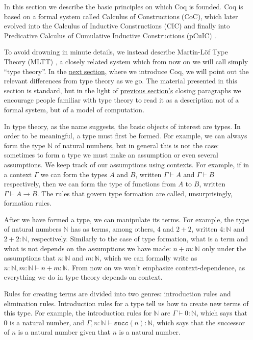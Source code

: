 \documentclass[declaration,mgr,english,shortabstract]{iithesis}
\newcommand{\m}[1]{\texttt{#1}}
\newcommand{\type}[2]{#1 \vdash #2}
\newcommand{\term}[3]{#1 \vdash #2 : #3}
\newcommand{\N}{\mathbb{N}}
\newcommand{\suc}[1]{\m{succ}(#1)}
\begin{document}
In this section we describe the basic principles on which Coq is founded. Coq is based on a formal system called Calculus of Constructions (CoC)\cite{CoC}, which later evolved into the Calculus of Inductive Constructions (CIC) \cite{CIC} and finally into Predicative Calculus of Cumulative Inductive Constructions (pCuIC) \cite{pCuIC}.

To avoid drowning in minute details, we instead describe Martin-L\"{o}f Type Theory (MLTT) \cite{MLTT1} \cite{MLTT2}, a closely related system which from now on we will call simply ``type theory''. In the \hyperref[coq]{next section}, where we introduce Coq, we will point out the relevant differences from type theory as we go. The material presented in this section is standard, but in the light of \hyperref[formal]{previous section's} closing paragraphs we encourage people familiar with type theory to read it as a description not of a formal system, but of a model of computation.

In type theory, as the name suggests, the basic objects of interest are types. In order to be meaningful, a type must first be formed. For example, we can always form the type $\N$ of natural numbers, but in general this is not the case: sometimes to form a type we must make an assumption or even several assumptions. We keep track of our assumptions using contexts. For example, if in a context $\Gamma$ we can form the types $A$ and $B$, written $\type{\Gamma}{A}$ and $\type{\Gamma}{B}$ respectively, then we can form the type of functions from $A$ to $B$, written $\type{\Gamma}{A \to B}$. The rules that govern type formation are called, unsurprisingly, formation rules.

After we have formed a type, we can manipulate its terms. For example, the type of natural numbers $\N$ has as terms, among others, $4$ and $2 + 2$, written $4 : \N$ and $2 + 2 : \N$, respectively. Similarly to the case of type formation, what is a term and what is not depends on the assumptions we have made: $n + m : \N$ only under the assumptions that $n : \N$ and $m : \N$, which we can formally write as $\term{n : \N, m : \N}{n + m}{\N}$. From now on we won't emphasize context-dependence, as everything we do in type theory depends on context.

Rules for creating terms are divided into two genres: introduction rules and elimination rules. Introduction rules for a type tell us how to create new terms of this type. For example, the introduction rules for $\N$ are $\term{\Gamma}{0}{\N}$, which says that $0$ is a natural number, and $\term{\Gamma, n : \N}{\suc{n}}{\N}$, which says that the successor of $n$ is a natural number given that $n$ is a natural number.
\end{document}
